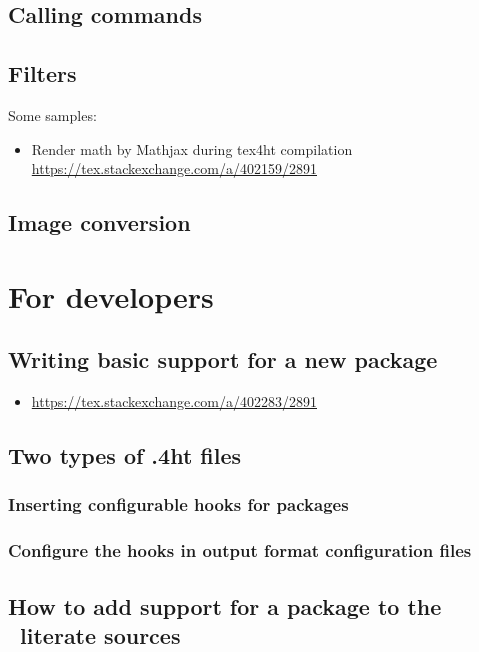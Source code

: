 \documentclass{book}
\begin{document}
\section{Calling commands}
\section{Filters}

Some samples:

\begin{itemize}
  \item Render math by Mathjax during tex4ht compilation \url{https://tex.stackexchange.com/a/402159/2891}
\end{itemize}
\section{Image conversion}

\chapter{For developers}

\section{Writing basic support for a new package}
\begin{itemize}
  \item \url{https://tex.stackexchange.com/a/402283/2891}
\end{itemize}

\section{Two types of .4ht files}

\subsection{Inserting configurable hooks for packages}

\subsection{Configure the hooks in output format configuration files}

\section{How to add support for a package to the \texfourht\ literate sources}
\end{document}
